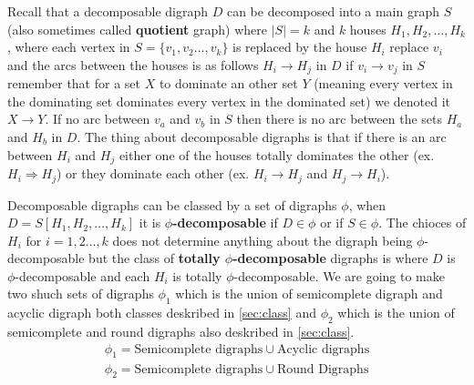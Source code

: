 Recall that a decomposable digraph $D$ can be decomposed into a main graph $S$ (also sometimes called \textbf{quotient} graph) where $|S|=k$ and $k$ houses $H_1,H_2,\dots , H_k$, where each vertex in $S=\lbrace v_1,v_2\dots ,v_k\rbrace$ is replaced by the house $H_i$ replace $v_i$ and the arcs between the houses is as follows $H_i \rightarrow H_j$ in $D$ if $v_i\rightarrow v_j$ in $S$ remember that for a set $X$ to dominate an other set $Y$ (meaning every vertex in the dominating set dominates every vertex in the dominated set) we denoted it $X \rightarrow Y$. If no arc between $v_a$ and $v_b$ in $S$ then there is no arc between the sets $H_a$ and $H_b$ in $D$. 
The thing about decomposable digraphs is that if there is an arc between $H_i$ and $H_j$ either one of the houses totally dominates the other (ex. $H_i \Rightarrow H_j$) or they dominate each other (ex. $H_i \rightarrow H_j$ and $H_j\rightarrow H_i$).

Decomposable digraphs can be classed by a set of digraphs $\phi$, when \\
$D=S[H_1,H_2,\dots ,H_k]$ it is \textbf{$\phi$-decomposable} if $D\in \phi$ or if $S\in \phi$. The chioces of $H_i$ for $i=1,2\dots , k$ does not determine anything about the digraph being $\phi$-decomposable but the class of \textbf{totally $\phi$-decomposable} digraphs is where $D$ is $\phi$-decomposable and each $H_i$ is totally $\phi$-decomposable. 
We are going to make two shuch sets of digraphs $\phi_1$ which is the union of semicomplete digraph and acyclic digraph both classes deskribed in \autoref{sec:class} and $\phi_2$ which is the union of semicomplete and round digraphs also deskribed in \autoref{sec:class}.  
\begin{align}
    \phi_1=\text{Semicomplete digraphs}\cup \text{Acyclic digraphs}
    \label{eq:phi1}\\
    \phi_2=\text{Semicomplete digraphs}\cup \text{Round Digraphs}
    \label{eq:phi2}
\end{align}

